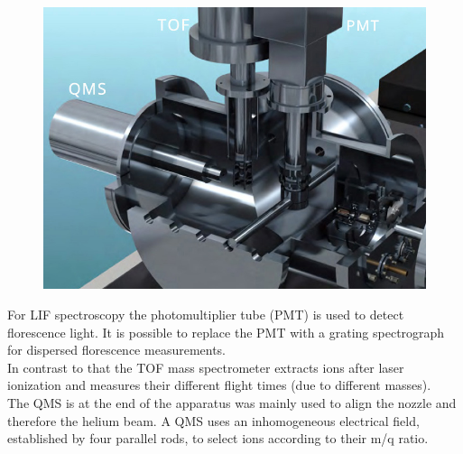 \documentclass[parskip,12pt,headsepline,a4paper] {scrbook}
\begin{document}
\begin{figure}[ht]
\centerline{
\includegraphics[width=15cm]{./experimental_setup/detection-chamber.jpg}}
\end{figure}

For LIF spectroscopy the photomultiplier tube (PMT) is used to detect florescence light. It is possible to replace the PMT with a grating spectrograph for dispersed florescence measurements. \\
In contrast to that the TOF mass spectrometer extracts ions after laser ionization and measures their different flight times (due to different masses). \\
The QMS is at the end of the apparatus was mainly used to align the nozzle and therefore the helium beam. A QMS uses an inhomogeneous electrical field, established by four parallel rods, to select ions according to their m/q ratio.
\end{document}
